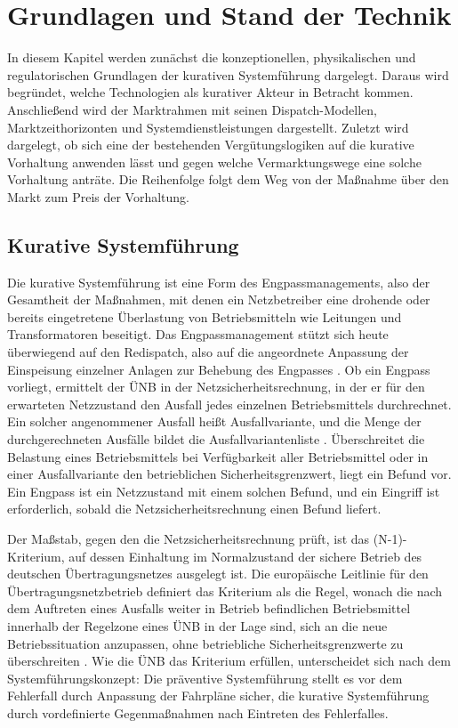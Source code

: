 \chapter{Grundlagen und Stand der Technik}
\label{ch:state_of_the_art}

In diesem Kapitel werden zunächst die konzeptionellen, physikalischen und regulatorischen Grundlagen der kurativen Systemführung dargelegt.
Daraus wird begründet, welche Technologien als kurativer Akteur in Betracht kommen.
Anschließend wird der Marktrahmen mit seinen Dispatch-Modellen, Marktzeithorizonten und Systemdienstleistungen dargestellt.
Zuletzt wird dargelegt, ob sich eine der bestehenden Vergütungslogiken auf die kurative Vorhaltung anwenden lässt und gegen welche Vermarktungswege eine solche Vorhaltung anträte.
Die Reihenfolge folgt dem Weg von der Maßnahme über den Markt zum Preis der Vorhaltung.

\section{Kurative Systemführung}
\label{sec:curative_basics}

Die kurative Systemführung ist eine Form des Engpassmanagements, also der Gesamtheit der Maßnahmen, mit denen ein Netzbetreiber eine drohende oder bereits eingetretene Überlastung von Betriebsmitteln wie Leitungen und Transformatoren beseitigt.
Das Engpassmanagement stützt sich heute überwiegend auf den Redispatch, also auf die angeordnete Anpassung der Einspeisung einzelner Anlagen zur Behebung des Engpasses \cite{bundesministerium_der_justiz_energiewirtschaftsgesetz_2025}.
Ob ein Engpass vorliegt, ermittelt der \ac{ÜNB} in der Netzsicherheitsrechnung, in der er für den erwarteten Netzzustand den Ausfall jedes einzelnen Betriebsmittels durchrechnet.
Ein solcher angenommener Ausfall heißt Ausfallvariante, und die Menge der durchgerechneten Ausfälle bildet die Ausfallvariantenliste \cite{europaische_kommission_verordnung_2017}.
Überschreitet die Belastung eines Betriebsmittels bei Verfügbarkeit aller Betriebsmittel oder in einer Ausfallvariante den betrieblichen Sicherheitsgrenzwert, liegt ein Befund vor.
Ein Engpass ist ein Netzzustand mit einem solchen Befund, und ein Eingriff ist erforderlich, sobald die Netzsicherheitsrechnung einen Befund liefert.

Der Maßstab, gegen den die Netzsicherheitsrechnung prüft, ist das \mbox{(N-1)-Kriterium}, auf dessen Einhaltung im Normalzustand der sichere Betrieb des deutschen Übertragungsnetzes ausgelegt ist.
Die europäische Leitlinie für den Übertragungsnetzbetrieb definiert das Kriterium als \glqq{}die Regel, wonach die nach dem Auftreten eines Ausfalls weiter in Betrieb befindlichen Betriebsmittel innerhalb der Regelzone eines \ac{ÜNB} in der Lage sind, sich an die neue Betriebssituation anzupassen, ohne betriebliche Sicherheitsgrenzwerte zu überschreiten\grqq{} \cite{europaische_kommission_verordnung_2017}.
Wie die \ac{ÜNB} das Kriterium erfüllen, unterscheidet sich nach dem Systemführungskonzept: Die präventive Systemführung stellt es vor dem Fehlerfall durch Anpassung der Fahrpläne sicher, die kurative Systemführung durch vordefinierte Gegenmaßnahmen nach Eintreten des Fehlerfalles.

